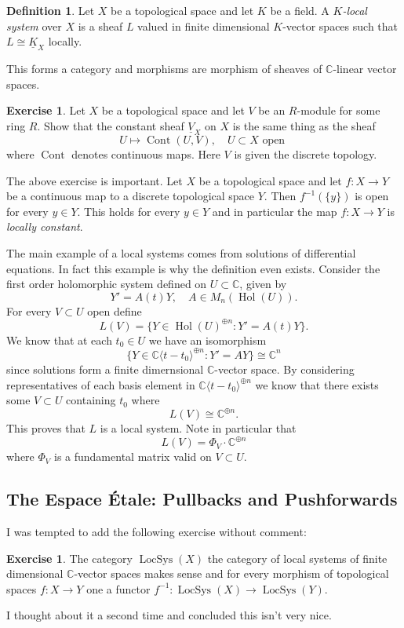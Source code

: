 \documentclass[12pt]{book}
\numberwithin{equation}{section}
\theoremstyle{definition}
\newtheorem{definition}[theorem]{Definition}
\newtheorem{exercise}[theorem]{Exercise}
\theoremstyle{remark}
\newcommand{\CC}{\mathbb{C}}
\newcommand{\hol}{\operatorname{Hol}}
\newcommand{\LocSys}{\operatorname{LocSys}}
\newcommand{\Cont}{\operatorname{Cont}}
\begin{document}
\begin{definition}
	Let $X$ be a topological space and let $K$ be a field. 
	A \emph{$K$-local system} over $X$ is a sheaf $L$ valued in finite dimensional $K$-vector spaces such that $L \cong \underline{K}_X$ locally. 
\end{definition}
This forms a category and morphisms are morphism of sheaves of $\CC$-linear vector spaces. 

\begin{exercise}\label{EX:locally-constant}
	Let $X$ be a topological space and let $V$ be an $R$-module for some ring $R$. 
	Show that the constant sheaf $\underline{V}_X$ on $X$ is the same thing as the sheaf  $$U\mapsto\Cont(U,V), \quad U \subset X \mbox{ open }$$ 
	where $\Cont$ denotes continuous maps.
	Here $V$ is given the discrete topology. 
\end{exercise}
The above exercise is important. 
Let $X$ be a topological space and let $f:X\to Y$ be a continuous map to a discrete topological space $Y$.
Then $f^{-1}(\lbrace y\rbrace)$ is open for every $y \in Y$. 
This holds for every $y\in Y$ and in particular the map $f:X\to Y$ is \emph{locally constant}. 

The main example of a local systems comes from solutions of differential equations. 
In fact this example is why the definition even exists. 
Consider the first order holomorphic system defined on $U \subset \CC$, given by 
$$ Y' = A(t) Y, \quad A \in M_n(\hol(U)).$$
For every $V \subset U$ open define  
$$ L(V) = \lbrace Y \in \hol(U)^{\oplus n} \colon Y' = A(t) Y \rbrace.$$
We know that at each $t_0 \in U$ we have an isomorphism 
$$ \lbrace Y \in \CC\langle t-t_0 \rangle^{\oplus n} \colon Y'=AY \rbrace \cong \CC^n $$
since solutions form a finite dimernsional $\CC$-vector space. 
By considering representatives of each basis element in $\CC\langle t-t_0 \rangle^{\oplus n}$ we know that there exists some $V \subset U$ containing $t_0$ where 
$$ L(V) \cong \CC^{\oplus n}.$$
This proves that $L$ is a local system. Note in particular that 
$$ L(V) = \Phi_V \cdot \CC^{\oplus n } $$
where $\Phi_V$ is a fundamental matrix valid on $V \subset U$. 

\subsection{The Espace \'Etale: Pullbacks and Pushforwards}

I was tempted to add the following exercise without comment:
\begin{exercise}
	The category $\LocSys(X)$ the category of local systems of finite dimensional $\CC$-vector spaces makes sense and for every morphism of topological spaces $f:X\to Y$ one a functor $f^{-1}:\LocSys(X) \to \LocSys(Y)$.
\end{exercise}
I thought about it a second time and concluded this isn't very nice.
\end{document}
